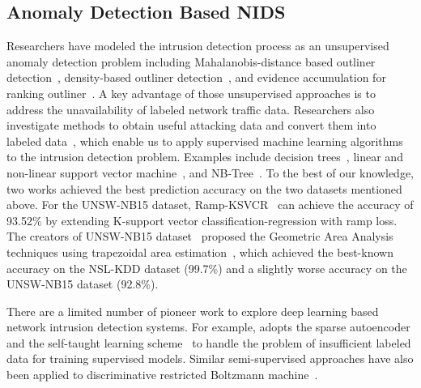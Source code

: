 \subsection{Anomaly Detection Based NIDS}
Researchers have modeled the intrusion detection process as an unsupervised
anomaly detection problem including Mahalanobis-distance based outliner detection~\cite{ComparativeAnomalyNIDS},
density-based outliner detection~\cite{LOF}, and evidence accumulation for ranking outliner~\cite{RankingOutliner}.
A key advantage of those unsupervised approaches is to address the unavailability of labeled network traffic data.
Researchers also investigate methods to obtain useful attacking data and convert them into labeled data~\cite{KDDCup, NSL-KDD, UNSW},
which enable us to apply supervised machine learning algorithms to the intrusion detection problem.
Examples include decision trees~\cite{DecisionTree}, linear and non-linear support vector machine~\cite{SVM},
and NB-Tree~\cite{NB-Tree}. To the best of our knowledge, two works achieved the best prediction accuracy on the two datasets mentioned above.
For the UNSW-NB15 dataset, Ramp-KSVCR~\cite{RampLossKSVCR} can achieve the accuracy of 93.52\% by extending K-support vector classification-regression with ramp loss. 
The creators of UNSW-NB15 dataset~\cite{UNSW} proposed the Geometric Area Analysis techniques using trapezoidal area estimation~\cite{GAA-ADS},
which achieved the best-known accuracy on the NSL-KDD dataset (99.7\%) and
a slightly worse accuracy on the UNSW-NB15 dataset (92.8\%).

There are a limited number of pioneer work to explore deep learning based network intrusion detection systems.
For example, \cite{STL-NIDS} adopts the sparse autoencoder and the self-taught learning scheme~\cite{SparseAE}
to handle the problem of insufficient labeled data for training supervised models.
Similar semi-supervised approaches have also been applied to discriminative restricted Boltzmann machine~\cite{AnomalyDetectionRBM}.
